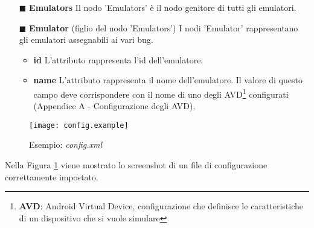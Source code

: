 \begin{itemize} [nosep]
\begin{itemize} [nosep]
libreria delle tecniche di offuscamento ('localSuppression', 'generalization'...).
		\item \textbf{columns} L'attributo rappresenta gli id delle colonne da offuscare, separati dal ';'. 
		\item \textbf{times} L'attributo rappresenta il numero di volte di applicazione della tecnica di offuscamento sui dati. 
			\end{itemize} 
			\item[$\blacksquare$] \textbf{Emulators}  \newline
		Il nodo 'Emulators' è il nodo genitore di tutti gli emulatori.
		\item[$\blacksquare$] \textbf{Emulator} (figlio del nodo 'Emulators') \newline
		I nodi 'Emulator' rappresentano gli emulatori assegnabili ai vari bug.
		 \begin{itemize} [nosep]	
				\item \textbf{id} L'attributo rappresenta l'id dell'emulatore. 
		 		\item \textbf{name} L'attributo rappresenta il nome dell'emulatore.   Il valore di questo campo deve corrispondere con il nome di uno degli AVD\footnote{\textbf{AVD}: Android Virtual Device, configurazione che definisce le caratteristiche di un dispositivo che si vuole simulare} configurati (Appendice A - Configurazione degli AVD).
			\end{itemize} 
\end{itemize}
\begin{figure}[H]
	\texttt{[image: config.example]}
	\centering
	\caption{Esempio: \emph{config.xml}}
    \label{fig:configexample}
\end{figure}
Nella Figura \ref{fig:configexample} viene mostrato lo screenshot di un file di configurazione correttamente impostato.



